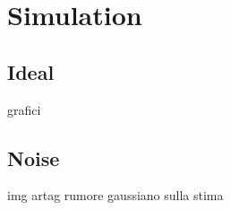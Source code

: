 \section{Simulation}
\subsection{Ideal}

grafici

\subsection{Noise}

img artag
rumore gaussiano sulla stima